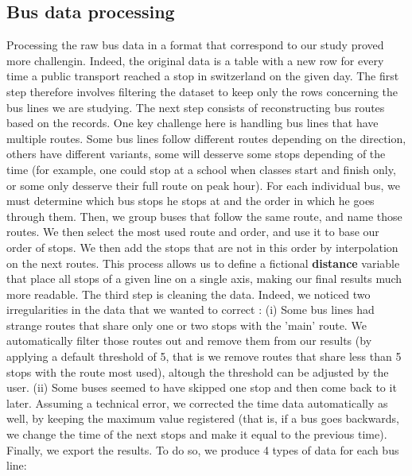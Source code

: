 \subsection{Bus data processing}
Processing the raw bus data in a format that correspond to our study proved more challengin. Indeed, the original data is a table with a new row for every time a public transport reached a stop in switzerland on the given day. The first step therefore involves filtering the dataset to keep only the rows concerning the bus lines we are studying. 
The next step consists of reconstructing bus routes based on the records. One key challenge here is handling bus lines that have multiple routes. Some bus lines follow different routes depending on the direction, others have different variants, some will desserve some stops depending of the time (for example, one could stop at a school when classes start and finish only, or some only desserve their full route on peak hour). For each individual bus, we must determine which bus stops he stops at and the order in which he goes through them. Then, we group buses that follow the same route, and name those routes. We then select the most used route and order, and use it to base our order of stops. We then add the stops that are not in this order by interpolation on the next routes. This process allows us to define a fictional \textbf{distance} variable that place all stops of a given line on a single axis, making our final results much more readable.
The third step is cleaning the data. Indeed, we noticed two irregularities in the data that we wanted to correct : (i) Some bus lines had strange routes that share only one or two stops with the 'main' route. We automatically filter those routes out and remove them from our results (by applying a default threshold of 5, that is we remove routes that share less than 5 stops with the route most used), altough the threshold can be adjusted by the user. (ii) Some buses seemed to have skipped one stop and then come back to it later. Assuming a technical error, we corrected the time data automatically as well, by keeping the maximum value registered (that is, if a bus goes backwards, we change the time of the next stops and make it equal to the previous time).
Finally, we export the results. To do so, we produce 4 types of data for each bus line:
